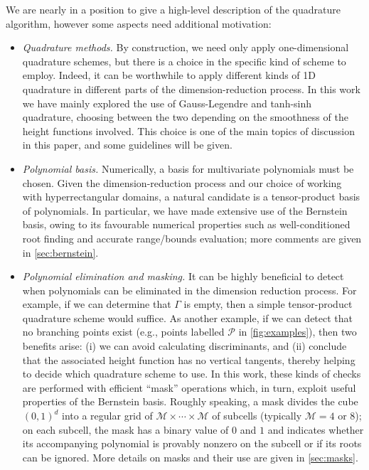 \documentclass[onefignum,onetabnum,onealgnum,oneeqnum]{siamart190516}
\begin{document}
We are nearly in a position to give a high-level description of the quadrature algorithm, however some aspects need additional motivation: 
\begin{itemize}
\item \textit{Quadrature methods.} By construction, we need only apply one-dimensional quadrature schemes, but there is a choice in the specific kind of scheme to employ. Indeed, it can be worthwhile to apply different kinds of 1D quadrature in different parts of the dimension-reduction process. In this work we have mainly explored the use of Gauss-Legendre and tanh-sinh quadrature, choosing between the two depending on the smoothness of the height functions involved. This choice is one of the main topics of discussion in this paper, and some guidelines will be given.

\item \textit{Polynomial basis.} Numerically, a basis for multivariate polynomials must be chosen. Given the dimension-reduction process and our choice of working with hyperrectangular domains, a natural candidate is a tensor-product basis of polynomials. In particular, we have made extensive use of the Bernstein basis, owing to its favourable numerical properties such as well-conditioned root finding and accurate range/bounds evaluation; more comments are given in \cref{sec:bernstein}.

\item \textit{Polynomial elimination and masking.} It can be highly beneficial to detect when polynomials can be eliminated in the dimension reduction process. For example, if we can determine that $\Gamma$ is empty, then a simple tensor-product quadrature scheme would suffice. As another example, if we can detect that no branching points exist (e.g., points labelled $\mathcal P$ in \cref{fig:examples}), then two benefits arise: (i) we can avoid calculating discriminants, and (ii) conclude that the associated height function has no vertical tangents, thereby helping to decide which quadrature scheme to use. In this work, these kinds of checks are performed with efficient ``mask'' operations which, in turn, exploit useful properties of the Bernstein basis. Roughly speaking, a mask divides the cube $(0,1)^d$ into a regular grid of $\mathcal M \times \cdots \times \mathcal M$ of subcells (typically $\mathcal M = 4$ or $8$); on each subcell, the mask has a binary value of $0$ and $1$ and indicates whether its accompanying polynomial is provably nonzero on the subcell or if its roots can be ignored. More details on masks and their use are given in \cref{sec:masks}.







\end{itemize}
\end{document}
